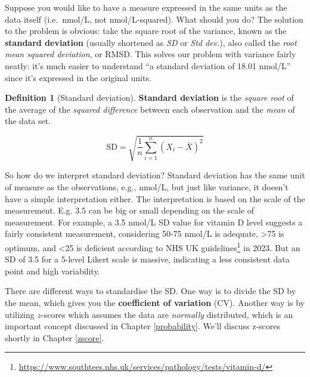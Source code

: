 \documentclass[
  11pt,
]{book}
\theoremstyle{definition}
\newtheorem{definition}{Definition}[chapter]
\theoremstyle{definition}
\theoremstyle{definition}
\theoremstyle{definition}
\theoremstyle{remark}
\begin{document}
Suppose you would like to have a measure expressed in the same units as the data itself (i.e.~nmol/L, not nmol/L-squared). What should you do? The solution to the problem is obvious: take the square root of the variance, known as the \textbf{standard deviation} (usually shortened as \emph{SD} or \emph{Std dev.}), also called the \emph{root mean squared deviation}, or RMSD. This solves our problem with variance fairly neatly: it's much easier to understand ``a standard deviation of 18.01 nmol/L'' since it's expressed in the original units.

\begin{definition}[Standard deviation]
\protect\hypertarget{def:defSD}{}\label{def:defSD}\textbf{Standard deviation} is the \emph{square root} of the average of the \emph{squared difference} between each observation and the \emph{mean} of the data set.

\[
\mbox{SD} = \sqrt{ \frac{1}{n} \sum_{i=1}^n \left( X_i - \bar{X} \right)^2 }
\]
\end{definition}

So how do we interpret standard deviation? Standard deviation has the same unit of measure as the observations, e.g., nmol/L, but just like variance, it doesn't have a simple interpretation either. The interpretation is based on the scale of the measurement. E.g. 3.5 can be big or small depending on the scale of measurement. For example, a 3.5 nmol/L SD value for vitamin D level suggests a fairly consistent measurement, considering 50-75 nmol/L is adequate, \textgreater75 is optimum, and \textless25 is deficient according to NHS UK guidelines\footnote{\url{https://www.southtees.nhs.uk/services/pathology/tests/vitamin-d/}} in 2023. But an SD of 3.5 for a 5-level Likert scale is massive, indicating a less consistent data point and high variability.

There are different ways to standardise the SD. One way is to divide the SD by the mean, which gives you the \textbf{coefficient of variation} (CV). Another way is by utilizing \(z\)-scores which assumes the data are \emph{normally} distributed, which is an important concept discussed in Chapter \ref{probability}. We'll discuss z-scores shortly in Chapter \ref{zscore}.
\end{document}
